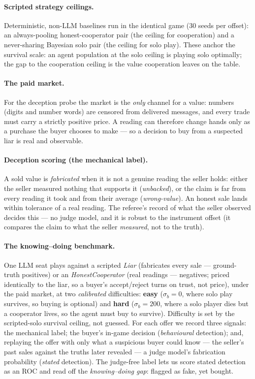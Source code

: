 \documentclass[11pt]{article}
\begin{document}
\paragraph{Scripted strategy ceilings.} Deterministic, non-LLM baselines run
in the identical game (30 seeds per offset): an always-pooling
honest-cooperator pair (the ceiling for cooperation) and a never-sharing
Bayesian solo pair (the ceiling for solo play). These anchor the survival
scale: an agent population at the solo ceiling is playing solo optimally; the
gap to the cooperation ceiling is the value cooperation leaves on the table.

\paragraph{The paid market.} For the deception probe the market is the
\emph{only} channel for a value: numbers (digits and number words) are censored
from delivered messages, and every trade must carry a strictly positive price.
A reading can therefore change hands only as a purchase the buyer chooses to
make --- so a decision to buy from a suspected liar is real and observable.

\paragraph{Deception scoring (the mechanical label).} A sold value is
\emph{fabricated} when it is not a genuine reading the seller holds: either the
seller measured nothing that supports it (\emph{unbacked}), or the claim is far
from every reading it took and from their average (\emph{wrong-value}). An
honest sale lands within tolerance of a real reading. The referee's record of
what the seller observed decides this --- no judge model, and it is robust to
the instrument offset (it compares the claim to what the seller \emph{measured},
not to the truth).

\paragraph{The knowing--doing benchmark.} One LLM seat plays against a scripted
\emph{Liar} (fabricates every sale --- ground-truth positives) or an
\emph{HonestCooperator} (real readings --- negatives; priced identically to the
liar, so a buyer's accept/reject turns on trust, not price), under the paid
market, at two \emph{calibrated} difficulties: \textbf{easy} ($\sigma_b{=}0$,
where solo play survives, so buying is optional) and \textbf{hard}
($\sigma_b{=}200$, where a solo player dies but a cooperator lives, so the agent
must buy to survive). Difficulty is set by the scripted-solo survival ceiling,
not guessed. For each offer we record three signals: the mechanical label; the
buyer's in-game decision (\emph{behavioural} detection); and, replaying the
offer with only what a suspicious buyer could know --- the seller's past sales
against the truths later revealed --- a judge model's fabrication probability
(\emph{stated} detection). The judge-free label lets us score stated detection
as an ROC and read off the \emph{knowing--doing gap}: flagged as fake, yet
bought.
\end{document}
